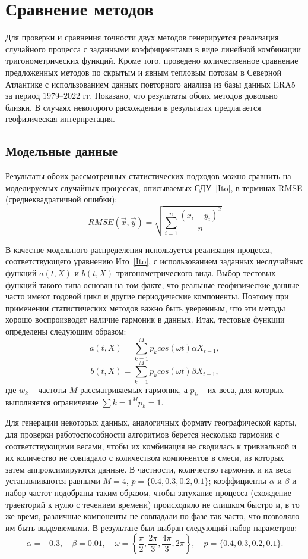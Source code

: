 \section{Сравнение методов}
Для проверки и сравнения точности двух методов генерируется реализация случайного процесса с заданными коэффициентами в виде линейной комбинации тригонометрических функций. Кроме того, проведено количественное сравнение предложенных методов по скрытым и явным тепловым потокам в Северной Атлантике с использованием данных повторного анализа из базы данных ERA5 за период $1979$--$2022$ гг. Показано, что результаты обоих методов довольно близки. В случаях некоторого расхождения в результатах предлагается геофизическая интерпретация.

\subsection{Модельные данные}
Результаты обоих рассмотренных статистических подходов можно сравнить на моделируемых случайных процессах, описываемых СДУ~\eqref{Ito}, в терминах RMSE (среднеквадратичной ошибки):
$$
RMSE(\vec{x}, \vec{y}) = \sqrt{\sum\limits_{i=1}^n \frac{(x_i - y_i)^2}{n}}
$$

В качестве модельного распределения используется реализация процесса, соответствующего уравнению Ито~\eqref{Ito}, с использованием заданных неслучайных функций $a(t,X)$ и $b(t,X)$ тригонометрического вида. Выбор тестовых функций такого типа основан на том факте, что реальные геофизические данные часто имеют годовой цикл и другие периодические компоненты. Поэтому при применении статистических методов важно быть уверенным, что эти методы хорошо воспроизводят наличие гармоник в данных. Итак, тестовые функции определены следующим образом:
$$
a(t, X) = \sum\limits_{k=1}^M p_k cos(\omega t) \alpha X_{t-1},
$$
$$
b(t, X) = \sum\limits_{k=1}^M p_k cos(\omega t) \beta X_{t-1},
$$
где $w_k$ -- частоты $M$ рассматриваемых гармоник, а $p_k$ -- их веса, для которых выполняется ограничение $\sum\limits{k=1}^M p_k = 1$.

Для генерации некоторых данных, аналогичных формату географической карты, для проверки работоспособности алгоритмов берется несколько гармоник с соответствующими весами, чтобы их комбинация не сводилась к тривиальной и их количество не совпадало с количеством компонентов в смеси, из которых затем аппроксимируются данные. В частности, количество гармоник и их веса устанавливаются равными $M=4$, $p=\{0.4,0.3,0.2,0.1\}$; коэффициенты $\alpha$ и $\beta$ и набор частот подобраны таким образом, чтобы затухание процесса (схождение траекторий к нулю с течением времени) происходило не слишком быстро и, в то же время, различные компоненты не совпадали по фазе так часто, что позволяло им быть выделяемыми. В результате был выбран следующий набор параметров:
$$
\alpha = -0.3, \quad \beta = 0.01, \quad \omega = \left\{ \frac{\pi}{2}, \frac{2\pi}{3}, \frac{4\pi}{3}, 2\pi \right\}, \quad p=\{0.4, 0.3, 0.2, 0.1\}.
$$

